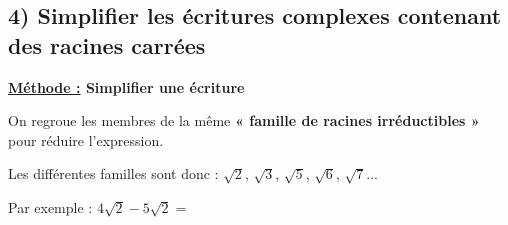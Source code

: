 \documentclass[12pt]{article}
\begin{document}
\vspace{10pt}

\subsection*{\hspace{1cm} 4) Simplifier les écritures complexes contenant des racines carrées}

\vspace{5pt}
{\color{RedOrange}\textbf{\underline{Méthode :} Simplifier une écriture}}

\vspace{5pt}
On regroue les membres de la même \textbf{« famille de racines irréductibles »} pour réduire l'expression.

\vspace{5pt}
Les différentes familles sont donc : $\sqrt{2}$, $\sqrt{3}$, $\sqrt{5}$, $\sqrt{6}$, $\sqrt{7}$... 

\vspace{20pt}
Par exemple : $4\sqrt{2} - 5\sqrt{2} = $

\vspace{2cm}
\end{document}
